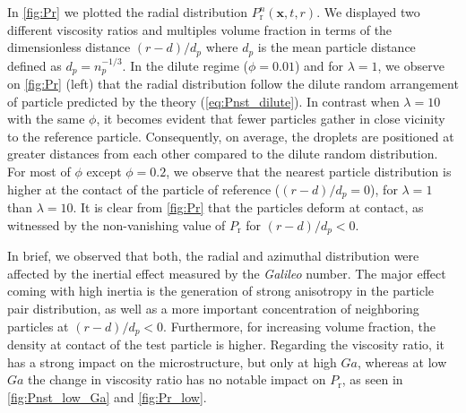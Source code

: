 In \ref{fig:Pr}  we plotted the radial distribution $P_\text{r}^n(\textbf{x},t,r)$. %
We displayed two different viscosity ratios and multiples volume fraction in terms of the dimensionless distance $(r - d)/d_p$ where $d_p$ is the mean particle distance defined as $d_p = n_p^{-1/3}$.  
In the dilute regime ($\phi = 0.01$) and for $\lambda=1$, we observe on \ref{fig:Pr} (left) that the radial distribution follow the dilute random arrangement of particle predicted by the theory (\ref{eq:Pnst_dilute}). 
In contrast when $\lambda = 10$ with the same $\phi$, it becomes evident that fewer particles gather in close vicinity to the reference particle. Consequently, on average, the droplets are positioned at greater distances from each other compared to the dilute random distribution. %
For most of $\phi$ except $\phi=0.2$, we observe that the nearest particle distribution is higher at the contact of the particle of reference ($(r-d)/d_p = 0$), for $\lambda = 1$ than $\lambda = 10$. 
It is clear from \ref{fig:Pr} that the particles deform at contact, as witnessed by the non-vanishing value of $P_\text{r}$ for $(r-d)/d_p<0$.

In brief, we observed that both, the radial and azimuthal distribution were affected by the inertial effect measured by the \textit{Galileo} number. 
The major effect coming with high inertia is the generation of strong anisotropy in the particle pair distribution, as well as a more important concentration of neighboring particles at $(r-d)/d_p < 0$. 
Furthermore, for increasing volume fraction, the density at contact of the test particle is higher. 
Regarding the viscosity ratio, it has a strong impact on the microstructure, but only at high $Ga$, whereas at low $Ga$ the change in viscosity ratio has no notable impact on $P_\text{r}$, as seen in \ref{fig:Pnst_low_Ga} and \ref{fig:Pr_low}. 

